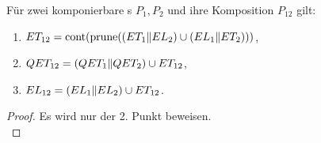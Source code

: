 \begin{Satz}
  Für zwei komponierbare \MEIO{}s $P_1,P_2$ und ihre Komposition $P_{12}$ gilt:
  \begin{enumerate}
    \item $ET _{12}=\mathrm{cont} (\mathrm{prune} ((ET _1\|EL _2)\cup (EL _1\|ET _2)))$,
    \item $QET _{12}=(QET _1\|QET _2)\cup ET _{12}$,
    \item $EL _{12}=(EL _1\|EL _2)\cup ET _{12}$.
  \end{enumerate}
\end{Satz}
\begin{proof}
  Es wird nur der 2. Punkt beweisen.\\
\end{proof}
